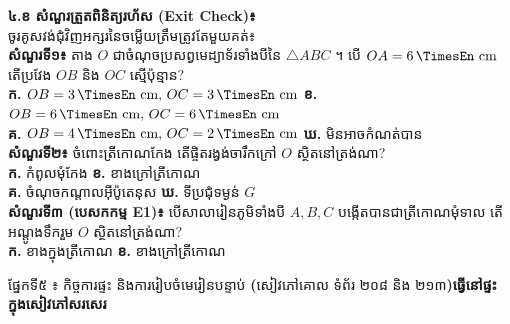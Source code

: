\documentclass[a4paper,10pt]{article}
\newcommand{\en}[1]{{\TimesEn #1}}
\newcommand{\enbf}[1]{{\TimesEn\textbf{#1}}}
\newcommand{\unit}[1]{\,\text{\en{#1}}}
\newcommand{\tri}[1]{\ensuremath{\triangle #1}}
\newcommand{\secbar}[2]{%
  \vspace{3pt}%
  \begin{tcolorbox}[
    enhanced, sharp corners, colback=headgray, colframe=black,
    boxrule=0.9pt, boxsep=1pt, top=2.5pt, bottom=2.5pt, left=6pt, right=6pt,
    after skip=3pt
  ]
    {\muol\fontsize{9.2pt}{13.5pt}\selectfont #1}\hfill{\fontsize{8.3pt}{11.5pt}\selectfont\textbf{#2}}
  \end{tcolorbox}%
}
\begin{document}
\begin{minipage}[t]{8.6cm}\vspace{0pt}
  \begin{tcolorbox}[
    enhanced, sharp corners, colback=white, colframe=black, equal height group=rowE5,
    boxrule=0.85pt, boxsep=2.2pt, top=3.5pt, bottom=3.5pt, left=5pt, right=5pt
  ]
    \textbf{៤.ខ សំណួរត្រួតពិនិត្យរហ័ស (\en{Exit Check})៖}\\
    ចូរគូសវង់ជុំវិញអក្សរនៃចម្លើយត្រឹមត្រូវតែមួយគត់៖\\[3.5pt]
    \textbf{សំណួរទី១៖} តាង $O$ ជាចំណុចប្រសព្វមេដ្យាទ័រទាំងបីនៃ $\tri{ABC}$ ។ បើ $OA = 6\unit{cm}$ តើប្រវែង $OB$ និង $OC$ ស្មើប៉ុន្មាន?\\
    \hspace*{0.15cm}\textbf{ក.} $OB=3\unit{cm},\, OC=3\unit{cm}$ \hspace{0.18cm}
    \textbf{ខ.} $OB=6\unit{cm},\, OC=6\unit{cm}$\\
    \hspace*{0.15cm}\textbf{គ.} $OB=4\unit{cm},\, OC=2\unit{cm}$ \hspace{0.18cm}
    \textbf{ឃ.} មិនអាចកំណត់បាន\\[5pt]
    \textbf{សំណួរទី២៖} ចំពោះត្រីកោណកែង តើផ្ចិតរង្វង់ចារឹកក្រៅ $O$ ស្ថិតនៅត្រង់ណា?\\
    \hspace*{0.15cm}\textbf{ក.} កំពូលមុំកែង \hspace{1.45cm}
    \textbf{ខ.} ខាងក្រៅត្រីកោណ\\
    \hspace*{0.15cm}\textbf{គ.} ចំណុចកណ្ដាលអ៊ីប៉ូតេនុស \hspace{0.2cm}
    \textbf{ឃ.} ទីប្រជុំទម្ងន់ $G$\\[4pt]
    \textbf{សំណួរទី៣ (បេសកកម្ម E1)៖} បើសាលារៀនភូមិទាំងបី $A,B,C$ បង្កើតបានជាត្រីកោណមុំទាល តើអណ្ដូងទឹករួម $O$ ស្ថិតនៅត្រង់ណា?\\
    \hspace*{0.15cm}\textbf{ក.} ខាងក្នុងត្រីកោណ \hspace{0.6cm} \textbf{ខ.} ខាងក្រៅត្រីកោណ
  \end{tcolorbox}
\end{minipage}

\vspace{2pt}
\secbar{ផ្នែកទី៥ ៖ កិច្ចការផ្ទះ និងការរៀបចំមេរៀនបន្ទាប់ \enbf{(}សៀវភៅគោល ទំព័រ ២០៨ និង ២១៣\enbf{)}}{ធ្វើនៅផ្ទះក្នុងសៀវភៅសរសេរ}
\end{document}

